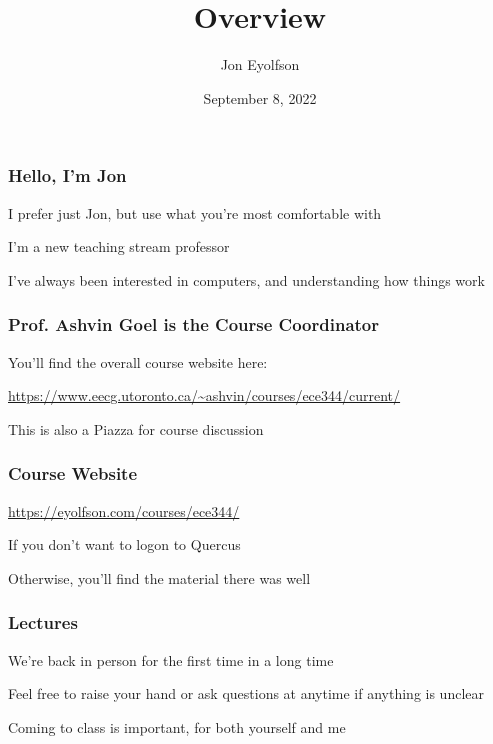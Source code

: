 

\title{Overview}
\author{Jon Eyolfson}
\date{September 8, 2022}



  \begin{frame}
    \titlepage
  \end{frame}

  \begin{frame}
    \frametitle{Hello, I'm Jon}

    I prefer just Jon, but use what you're most comfortable with

    \vspace{2em}

    I'm a new teaching stream professor

    \vspace{2em}

    I've always been interested in computers, and understanding how things work
  \end{frame}

  \begin{frame}
    \frametitle{Prof. Ashvin Goel is the Course Coordinator}

    You'll find the overall course website here:

    \url{https://www.eecg.utoronto.ca/~ashvin/courses/ece344/current/}

    \vspace{2em}

    This is also a Piazza for course discussion
  \end{frame}

  \begin{frame}
    \frametitle{Course Website}

    \url{https://eyolfson.com/courses/ece344/}

    \hspace{2em} If you don't want to logon to Quercus

    \vspace{2em}

    Otherwise, you'll find the material there was well
  \end{frame}

  \begin{frame}
    \frametitle{Lectures}

    We're back in person for the first time in a long time

    \vspace{2em}

    Feel free to raise your hand or ask questions at anytime if anything is
    unclear

    \vspace{2em}

    Coming to class is important, for both yourself and me
  \end{frame}

